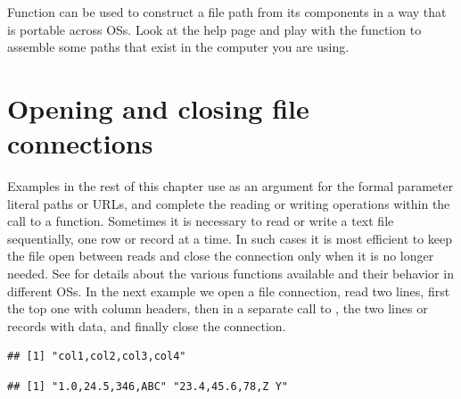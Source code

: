\documentclass[krantz2]{krantz}\usepackage{knitr}
\begin{document}
\begin{playground}
Function  can be used to construct a file path from its components in a way that is portable across OSs. Look at the help page and play with the function to assemble some paths that exist in the computer you are using.
\end{playground}

\section{Opening and closing file connections}\label{sec:io:connections}

Examples in the rest of this chapter use as an argument for the  formal parameter literal paths or URLs, and complete the reading or writing operations within the call to a function. Sometimes it is necessary to read or write a text file sequentially, one row or record at a time. In such cases it is most efficient to keep the file open between reads and close the connection only when it is no longer needed. See  for details about the various functions available and their behavior in different OSs. In the next example we open a file connection, read two lines, first the top one with column headers, then in a separate call to , the two lines or records with data, and finally close the connection.

\begin{knitrout}\footnotesize
{}\color{fgcolor}\begin{kframe}
\begin{alltt}
 \hlkwb{<-} \hlstd{(}\hlstd{,}  \hlstd{=} \hlstd{)} 
  \hlstd{=} \hlstd{)}
\end{alltt}
\begin{verbatim}
## [1] "col1,col2,col3,col4"
\end{verbatim}
\end{kframe}
\end{knitrout}

\begin{knitrout}\footnotesize
{}\color{fgcolor}\begin{kframe}
\begin{alltt}
  \hlstd{=} \hlstd{)}
\end{alltt}
\begin{verbatim}
## [1] "1.0,24.5,346,ABC" "23.4,45.6,78,Z Y"
\end{verbatim}
\begin{alltt}
\end{alltt}
\end{kframe}
\end{knitrout}
\end{document}
